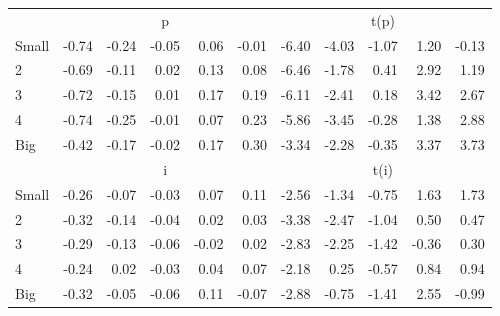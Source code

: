 \begin{table}[!ht]
\begin{tabular}{lrrrrrrrrrr}
      & \multicolumn{5}{c}{p} & \multicolumn{5}{c}{t(p)}
    
    \\
      \cmidrule(r){2-6} \cmidrule(r){7-11}

    Small   & -0.74  & -0.24  & -0.05  & 0.06  & -0.01  & -6.40  & -4.03  & -1.07  & 1.20  & -0.13  \\
         2  & -0.69  & -0.11  & 0.02  & 0.13  & 0.08  & -6.46  & -1.78  & 0.41  & 2.92  & 1.19  \\
         3  & -0.72  & -0.15  & 0.01  & 0.17  & 0.19  & -6.11  & -2.41  & 0.18  & 3.42  & 2.67  \\
         4  & -0.74  & -0.25  & -0.01  & 0.07  & 0.23  & -5.86  & -3.45  & -0.28  & 1.38  & 2.88  \\
    Big     & -0.42  & -0.17  & -0.02  & 0.17  & 0.30  & -3.34  & -2.28  & -0.35  & 3.37  & 3.73  \\

  
    
      & \multicolumn{5}{c}{i} & \multicolumn{5}{c}{t(i)}
    
    \\
      \cmidrule(r){2-6} \cmidrule(r){7-11}

    Small   & -0.26  & -0.07  & -0.03  & 0.07  & 0.11  & -2.56  & -1.34  & -0.75  & 1.63  & 1.73  \\
         2  & -0.32  & -0.14  & -0.04  & 0.02  & 0.03  & -3.38  & -2.47  & -1.04  & 0.50  & 0.47  \\
         3  & -0.29  & -0.13  & -0.06  & -0.02  & 0.02  & -2.83  & -2.25  & -1.42  & -0.36  & 0.30  \\
         4  & -0.24  & 0.02  & -0.03  & 0.04  & 0.07  & -2.18  & 0.25  & -0.57  & 0.84  & 0.94  \\
    Big     & -0.32  & -0.05  & -0.06  & 0.11  & -0.07  & -2.88  & -0.75  & -1.41  & 2.55  & -0.99  \\

  

  \bottomrule
\end{tabular}
\label{tbl:25_Size_Prior_F16}
\end{table}